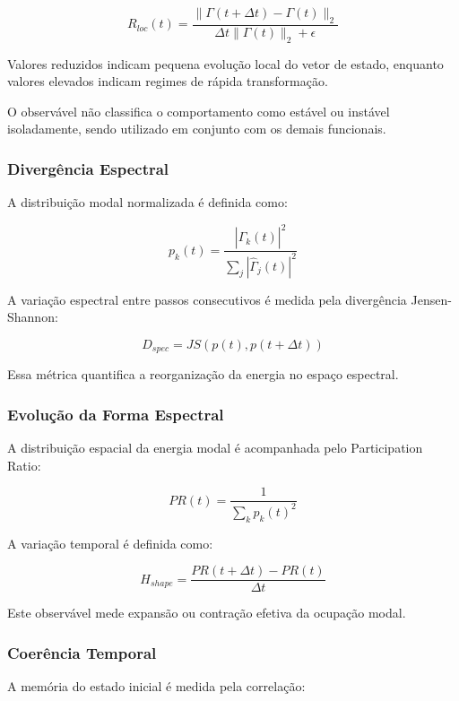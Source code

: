 \documentclass[11pt,a4paper]{article}
\begin{document}
\[
R_{loc}(t)
=
\frac{
\|\Gamma(t+\Delta t)-\Gamma(t)\|_2
}{
\Delta t\|\Gamma(t)\|_2+\epsilon
}
\]

Valores reduzidos indicam pequena evolução local do vetor de estado,
enquanto valores elevados indicam regimes de rápida transformação.

O observável não classifica o comportamento como estável ou instável
isoladamente, sendo utilizado em conjunto com os demais funcionais.


\subsubsection{Divergência Espectral}

A distribuição modal normalizada é definida como:

\[
p_k(t)
=
\frac{
|\hat{\Gamma}_k(t)|^2
}{
\sum_j |\hat{\Gamma}_j(t)|^2
}
\]

A variação espectral entre passos consecutivos é medida pela
divergência Jensen-Shannon:

\[
D_{spec}
=
JS
(
p(t),
p(t+\Delta t)
)
\]

Essa métrica quantifica a reorganização da energia no espaço espectral.


\subsubsection{Evolução da Forma Espectral}

A distribuição espacial da energia modal é acompanhada pelo
Participation Ratio:

\[
PR(t)
=
\frac{
1
}{
\sum_k p_k(t)^2
}
\]

A variação temporal é definida como:

\[
H_{shape}
=
\frac{
PR(t+\Delta t)-PR(t)
}{
\Delta t
}
\]

Este observável mede expansão ou contração efetiva da ocupação modal.


\subsubsection{Coerência Temporal}

A memória do estado inicial é medida pela correlação:
\end{document}
